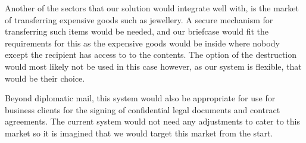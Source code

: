 Another of the sectors that our solution would integrate well with, is the market of transferring expensive goods such as jewellery. A secure mechanism for transferring such items would be needed, and our briefcase would fit the requirements for this as the expensive goods would be inside where nobody except the recipient has access to to the contents. The option of the destruction would most likely not be used in this case however, as our system is flexible, that would be their choice. 

Beyond diplomatic mail, this system would also be appropriate for use for business clients for the signing of confidential legal documents and contract agreements. The current system would not need any adjustments to cater to this market so it is imagined that we would target this market from the start. 
